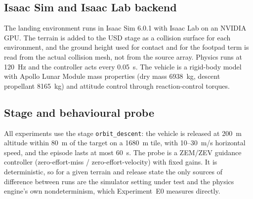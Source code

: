 \subsection{Isaac Sim and Isaac Lab backend}\label{sec:isaac}
The landing environment runs in Isaac Sim 6.0.1 with Isaac Lab on an NVIDIA GPU. The terrain is added to the USD stage as a collision surface for each environment, and the ground height used for contact and for the footpad term is read from the actual collision mesh, not from the source array. Physics runs at 120~Hz and the controller acts every 0.05~s. The vehicle is a rigid-body model with Apollo Lunar Module mass properties (dry mass 6938~kg, descent propellant 8165~kg) and attitude control through reaction-control torques.

\subsection{Stage and behavioural probe}\label{sec:stage}
All experiments use the stage \texttt{orbit\_descent}: the vehicle is released at 200~m altitude within 80~m of the target on a 1680~m tile, with 10--30~m/s horizontal speed, and the episode lasts at most 60~s. The probe is a ZEM/ZEV guidance controller (zero-effort-miss / zero-effort-velocity) with fixed gains. It is deterministic, so for a given terrain and release state the only sources of difference between runs are the simulator setting under test and the physics engine's own nondeterminism, which Experiment~E0 measures directly.
